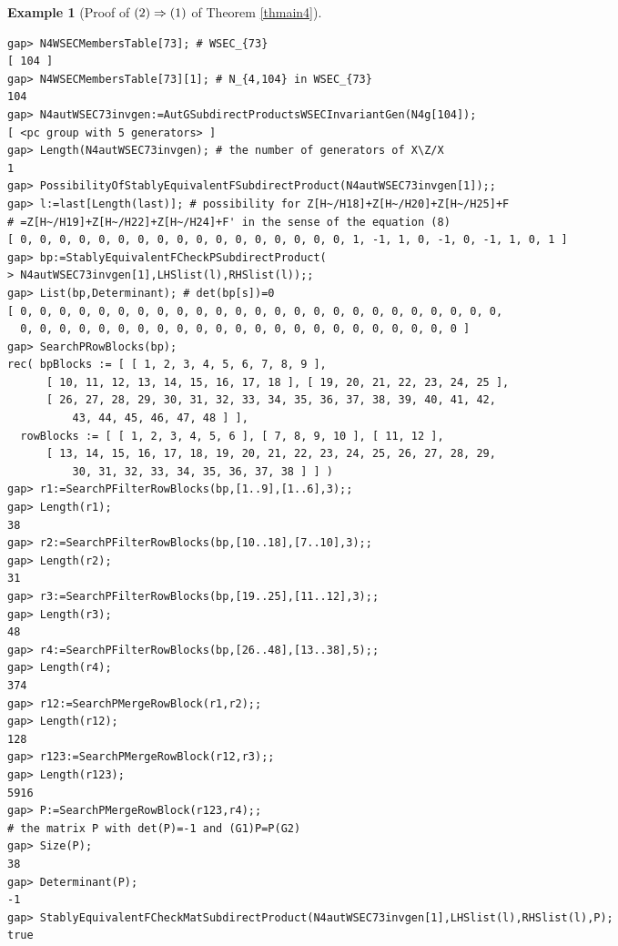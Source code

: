 \documentclass{amsart}
\theoremstyle{plain}
\theoremstyle{definition}
\newtheorem{example}[theorem]{Example}
\theoremstyle{remark}
\begin{document}
\begin{example}[Proof of ${\rm (2)}\Rightarrow {\rm (1)}$ of {Theorem \ref{thmain4}}]
\begin{verbatim}
gap> N4WSECMembersTable[73]; # WSEC_{73}
[ 104 ]
gap> N4WSECMembersTable[73][1]; # N_{4,104} in WSEC_{73}
104
gap> N4autWSEC73invgen:=AutGSubdirectProductsWSECInvariantGen(N4g[104]);
[ <pc group with 5 generators> ]
gap> Length(N4autWSEC73invgen); # the number of generators of X\Z/X
1
gap> PossibilityOfStablyEquivalentFSubdirectProduct(N4autWSEC73invgen[1]);;
gap> l:=last[Length(last)]; # possibility for Z[H~/H18]+Z[H~/H20]+Z[H~/H25]+F
# =Z[H~/H19]+Z[H~/H22]+Z[H~/H24]+F' in the sense of the equation (8)
[ 0, 0, 0, 0, 0, 0, 0, 0, 0, 0, 0, 0, 0, 0, 0, 0, 0, 1, -1, 1, 0, -1, 0, -1, 1, 0, 1 ]
gap> bp:=StablyEquivalentFCheckPSubdirectProduct(
> N4autWSEC73invgen[1],LHSlist(l),RHSlist(l));;
gap> List(bp,Determinant); # det(bp[s])=0
[ 0, 0, 0, 0, 0, 0, 0, 0, 0, 0, 0, 0, 0, 0, 0, 0, 0, 0, 0, 0, 0, 0, 0, 0, 0, 
  0, 0, 0, 0, 0, 0, 0, 0, 0, 0, 0, 0, 0, 0, 0, 0, 0, 0, 0, 0, 0, 0, 0 ]
gap> SearchPRowBlocks(bp);
rec( bpBlocks := [ [ 1, 2, 3, 4, 5, 6, 7, 8, 9 ], 
      [ 10, 11, 12, 13, 14, 15, 16, 17, 18 ], [ 19, 20, 21, 22, 23, 24, 25 ], 
      [ 26, 27, 28, 29, 30, 31, 32, 33, 34, 35, 36, 37, 38, 39, 40, 41, 42, 
          43, 44, 45, 46, 47, 48 ] ], 
  rowBlocks := [ [ 1, 2, 3, 4, 5, 6 ], [ 7, 8, 9, 10 ], [ 11, 12 ], 
      [ 13, 14, 15, 16, 17, 18, 19, 20, 21, 22, 23, 24, 25, 26, 27, 28, 29, 
          30, 31, 32, 33, 34, 35, 36, 37, 38 ] ] )
gap> r1:=SearchPFilterRowBlocks(bp,[1..9],[1..6],3);;
gap> Length(r1);
38
gap> r2:=SearchPFilterRowBlocks(bp,[10..18],[7..10],3);;
gap> Length(r2);
31
gap> r3:=SearchPFilterRowBlocks(bp,[19..25],[11..12],3);;
gap> Length(r3);
48
gap> r4:=SearchPFilterRowBlocks(bp,[26..48],[13..38],5);;
gap> Length(r4);
374
gap> r12:=SearchPMergeRowBlock(r1,r2);;
gap> Length(r12);
128
gap> r123:=SearchPMergeRowBlock(r12,r3);;
gap> Length(r123);
5916
gap> P:=SearchPMergeRowBlock(r123,r4);;
# the matrix P with det(P)=-1 and (G1)P=P(G2)
gap> Size(P);
38
gap> Determinant(P);
-1
gap> StablyEquivalentFCheckMatSubdirectProduct(N4autWSEC73invgen[1],LHSlist(l),RHSlist(l),P);
true


\end{verbatim}
\end{example}
\end{document}

